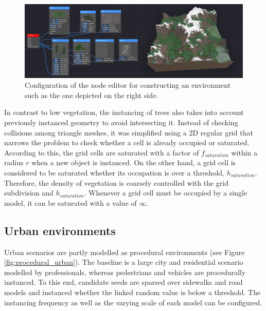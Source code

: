 \begin{figure}[hbt]
    \centering
    \includegraphics[width=\linewidth]{figs/lidar_simulation/node_editor.png}
	\caption{Configuration of the node editor for constructing an environment such as the one depicted on the right side.  }
	\label{fig:node_editor}
\end{figure}

In contrast to low vegetation, the instancing of trees also takes into account previously instanced geometry to avoid intersecting it. Instead of checking collisions among triangle meshes, it was simplified using a 2D regular grid that narrows the problem to check whether a cell is already occupied or saturated. According to this, the grid cells are saturated with a factor of $f_{\textit{saturation}}$ within a radius $r$ when a new object is instanced. On the other hand, a grid cell is considered to be saturated whether its occupation is over a threshold, $h_{\textit{saturation}}$. Therefore, the density of vegetation is coarsely controlled with the grid subdivision and $h_{\textit{saturation}}$. Whenever a grid cell must be occupied by a single model, it can be saturated with a value of $\infty$. 

\subsection{Urban environments}

Urban scenarios are partly modelled as procedural environments (see Figure \ref{fig:procedural_urban}). The baseline is a large city and residential scenario modelled by professionals, whereas pedestrians and vehicles are procedurally instanced. To this end, candidate seeds are sparsed over sidewalks and road models and instanced whether the linked random value is below a threshold. The instancing frequency as well as the varying scale of each model can be configured. 

